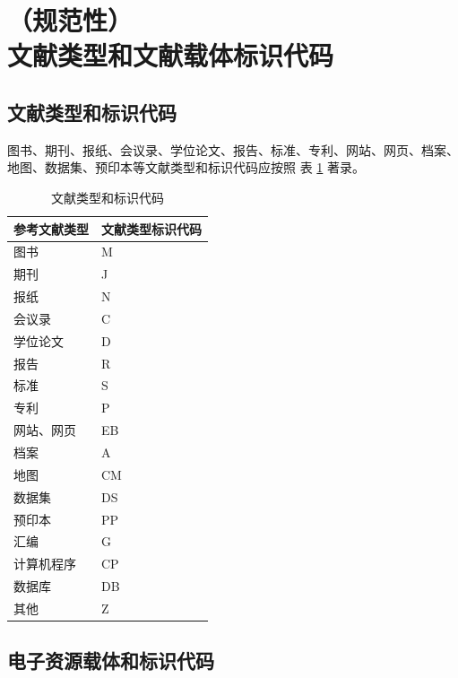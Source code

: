 \documentclass[twoside]{article}%
\begin{document}
\section[文献类型和文献载体标识代码]{（规范性）\\文献类型和文献载体标识代码}
\label{sec:ids:mediums}

\subsection{文献类型和标识代码}

图书、期刊、报纸、会议录、学位论文、报告、标准、专利、网站、网页、档案、地图、数据集、预印本等文献类型和标识代码应按照 表 \ref{tab:ref-type-id} 著录。

\begin{table}[htbp]
\centering
\caption{文献类型和标识代码}
\label{tab:ref-type-id}
\begin{tabularx}{\linewidth}{|>{\centering}X|>{\centering\arraybackslash}X|}
\hline
参考文献类型 & 文献类型标识代码 \\
\hline
图书 & M \\
\hline
期刊 & J \\
\hline
报纸 & N \\
\hline
会议录 & C \\
\hline
学位论文 & D \\
\hline
报告 & R \\
\hline
标准 & S \\
\hline
专利 & P \\
\hline
网站、网页 & EB \\
\hline
档案 & A \\
\hline
地图 & CM \\
\hline
数据集 & DS \\
\hline
预印本 & PP \\
\hline
汇编 & G \\
\hline
计算机程序 & CP \\
\hline
数据库 & DB \\
\hline
其他 & Z \\
\hline
\end{tabularx}
\end{table}


\subsection{电子资源载体和标识代码}
\end{document}
